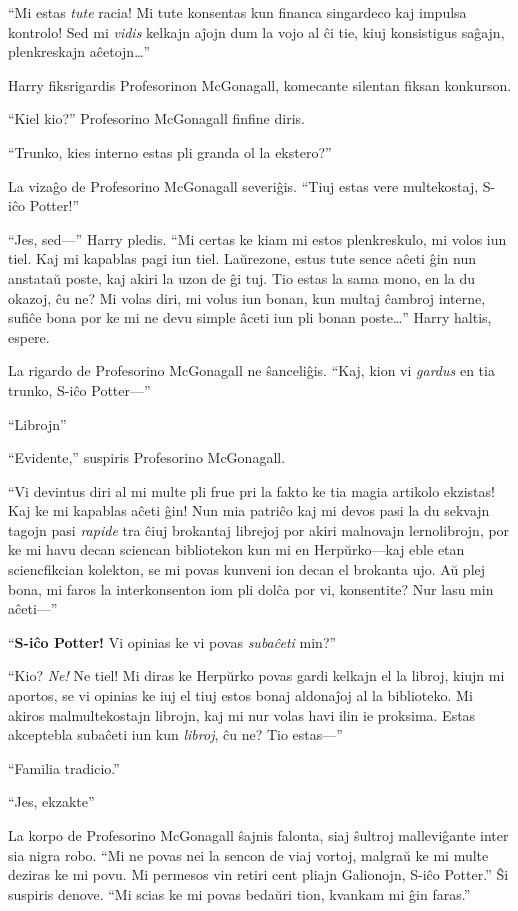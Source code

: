 ``Mi estas \emph{tute} racia! Mi tute konsentas kun financa singardeco
kaj impulsa kontrolo! Sed mi \emph{vidis} kelkajn aĵojn dum la vojo al ĉi
tie, kiuj konsistigus saĝajn, plenkreskajn aĉetojn\ldots''

Harry fiksrigardis Profesorinon McGonagall, komecante silentan fiksan
konkurson.

``Kiel kio?'' Profesorino McGonagall finfine diris.

``Trunko, kies interno estas pli granda ol la ekstero?''

La vizaĝo de Profesorino McGonagall severiĝis. ``Tiuj estas vere
multekostaj, S-iĉo Potter!''

``Jes, sed—'' Harry pledis. ``Mi certas ke kiam mi estos plenkreskulo, mi
volos iun tiel. Kaj mi kapablas pagi iun tiel. Laŭrezone, estus tute
sence aĉeti ĝin nun anstataŭ poste, kaj akiri la uzon de ĝi
tuj. Tio estas la sama mono, en la du okazoj, ĉu ne?  Mi volas diri, mi volus
iun bonan, kun multaj ĉambroj interne, sufiĉe bona por ke mi ne devu
simple âceti iun pli bonan poste\ldots'' Harry haltis, espere.

La rigardo de Profesorino McGonagall ne ŝanceliĝis. ``Kaj, kion vi
\emph{gardus} en tia trunko, S-iĉo Potter—''

``Librojn''

``Evidente,'' suspiris Profesorino McGonagall.

``Vi devintus diri al mi multe pli frue pri la fakto ke tia magia
artikolo ekzistas! Kaj ke mi kapablas aĉeti ĝin! Nun mia patriĉo kaj mi
devos pasi la du sekvajn tagojn pasi \emph{rapide} tra ĉiuj brokantaj
librejoj por akiri malnovajn lernolibrojn, por ke mi havu decan
sciencan bibliotekon kun mi en Herpŭrko—kaj eble etan sciencfikcian
kolekton, se mi povas kunveni ion decan el brokanta ujo. Aŭ plej bona,
mi faros la interkonsenton iom pli dolĉa por vi, konsentite? Nur lasu
min aĉeti—''

``\textbf{S-iĉo Potter!} Vi opinias ke vi povas \emph{subaĉeti} min?''

``Kio? \emph{Ne!} Ne tiel! Mi diras ke Herpŭrko povas gardi kelkajn el
la libroj, kiujn mi aportos, se vi opinias ke iuj el tiuj estos bonaj
aldonaĵoj al la biblioteko. Mi akiros malmultekostajn librojn, kaj mi
nur volas havi ilin ie proksima. Estas akceptebla subaĉeti iun kun
\emph{libroj}, ĉu ne? Tio estas—''

``Familia tradicio.''

``Jes, ekzakte''

La korpo de Profesorino McGonagall ŝajnis falonta, siaj ŝultroj
malleviĝante inter sia nigra robo. ``Mi ne povas nei la sencon de viaj
vortoj, malgraŭ ke mi multe deziras ke mi povu. Mi permesos vin
retiri cent pliajn Galionojn, S-iĉo Potter.'' Ŝi suspiris denove. ``Mi
scias ke mi povas bedaŭri tion, kvankam mi ĝin faras.''


